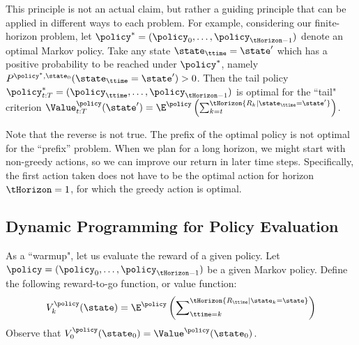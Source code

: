 This principle is not an actual claim, but rather a guiding
principle that can be applied in different ways to each problem. For
example, considering our finite-horizon problem, let ${\policy ^*} =
({\policy _0}, \ldots ,{\policy _{\tHorizon -1}})$ denote an optimal
Markov policy. Take any state ${\state_\ttime} = \state'$ which has
a positive probability to be reached under ${\policy ^*}$, namely
${P^{\policy^* ,{\state_0}}}({\state_\ttime} = \state')
> 0$. Then the tail policy $\policy^*_{t:T}=({\policy _\ttime}, \ldots ,{\policy _{\tHorizon -1}})$ is optimal for the ``tail" criterion $\Value_{t:T}^\policy
(\state') = {\E^\policy }\left( {\sum\nolimits_{k = t}^\tHorizon
{{R_k}|{\state_\ttime} = \state'} } \right)$.

Note that the reverse is not true. The prefix of the optimal policy
is not optimal for the ``prefix'' problem. When we plan for a long
horizon, we might start with non-greedy actions, so we can improve
our return in later time steps. Specifically, the first action taken
does not have to be the optimal action for horizon $\tHorizon=1$,
for which the greedy action is optimal.


\subsection{Dynamic Programming for Policy Evaluation}\label{sss:pol_eval}
As a ``warmup", let us evaluate the reward of a given policy. Let
$\policy  = ({\policy _0}, \ldots ,{\policy _{\tHorizon -1}})$ be a
given Markov policy. Define the following reward-to-go function, or
value function:
\[V_k^\policy (\state) = {\E^\policy }\left( {\sum\nolimits_{\ttime = k}^\tHorizon {{R_\ttime}|{\state_k} = \state} } \right)\]
Observe that $V_0^\policy ({\state_0}) = {\Value^\policy }({\state_0})$.

